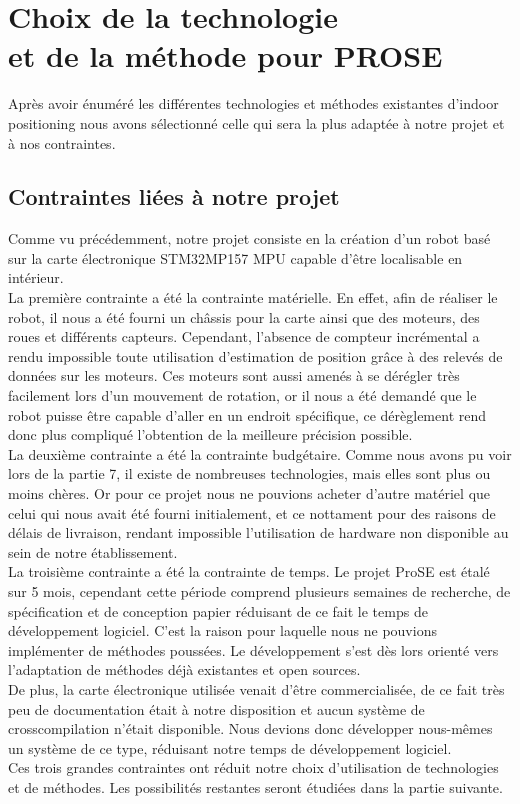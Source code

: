 \section{Choix de la technologie \\ et de la méthode pour PROSE}


Après avoir énuméré les différentes technologies et méthodes existantes d'indoor positioning nous avons sélectionné celle qui sera la plus adaptée à notre projet et à nos contraintes.


\subsection{Contraintes liées à notre projet}
Comme vu précédemment, notre projet consiste en la création d'un robot basé sur la carte électronique STM32MP157 MPU capable d'être localisable en intérieur. 
\medskip
\\
La première contrainte a été la contrainte matérielle. 
En effet, afin de réaliser le robot, il nous a été fourni un châssis pour la carte ainsi que des moteurs, des roues et différents capteurs.
Cependant, l'absence de compteur incrémental a rendu impossible toute utilisation d'estimation de position grâce à des relevés de données sur les moteurs.
Ces moteurs sont aussi amenés à se dérégler très facilement lors d'un mouvement de rotation, or il nous a été demandé que le robot puisse être capable d'aller en un endroit spécifique, ce dérèglement rend donc plus compliqué l'obtention de la meilleure précision possible.
\medskip
\\
La deuxième contrainte a été la contrainte budgétaire.
Comme nous avons pu voir lors de la partie 7, il existe de nombreuses technologies, mais elles sont plus ou moins chères. Or pour ce projet nous ne pouvions acheter d'autre matériel que celui qui nous avait été fourni initialement, et ce nottament pour des raisons de délais de livraison, rendant impossible l'utilisation de hardware non disponible au sein de notre établissement.
\medskip
\\
La troisième contrainte a été la contrainte de temps.
Le projet ProSE est étalé sur 5 mois, cependant cette période comprend plusieurs semaines de recherche, de spécification et de conception papier réduisant de ce fait le temps de développement logiciel.
C'est la raison pour laquelle nous ne pouvions implémenter de méthodes poussées. Le développement s'est dès lors orienté vers l'adaptation de méthodes déjà existantes et open sources.
\medskip
\\
De plus, la carte électronique utilisée venait d'être commercialisée, de ce fait très peu de documentation était à notre disposition et aucun système de crosscompilation n’était disponible. Nous devions donc développer nous-mêmes un système de ce type, réduisant notre temps de développement logiciel.
\medskip
\\
Ces trois grandes contraintes ont réduit notre choix d'utilisation de technologies et de méthodes. Les possibilités restantes seront étudiées dans la partie suivante.


